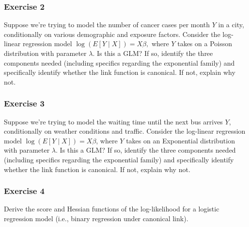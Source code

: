 \documentclass{beamer}
\begin{document}
\begin{frame}
\frametitle{Exercise 2}

Suppose we’re trying to model the number of cancer cases per month $Y$ in a city, conditionally on various demographic and exposure factors. Consider the log-linear regression model $\log (E[Y \mid X]) = X\beta,$ where $Y$ takes on a Poisson distribution with parameter  $\lambda.$ Is this a GLM? If so, identify the three components needed (including specifics regarding the exponential family) and specifically identify whether the link function is canonical. If not, explain why not.
\end{frame}

\begin{frame}
\frametitle{Exercise 3}

Suppose we’re trying to model the waiting time until the next bus arrives $Y$, conditionally on weather conditions and traffic. Consider the log-linear regression model $\log (E[Y \mid X]) = X\beta$, where $Y$ takes on an Exponential distribution with parameter $\lambda$. Is this a GLM? If so, identify the three components needed (including specifics regarding the exponential family) and specifically identify whether the link function is canonical. If not, explain why not.

\end{frame}

\begin{frame}
\frametitle{Exercise 4}

Derive the score and Hessian functions of the log-likelihood for a logistic regression model (i.e., binary regression under canonical link).

\end{frame}

%
%
\end{document}
